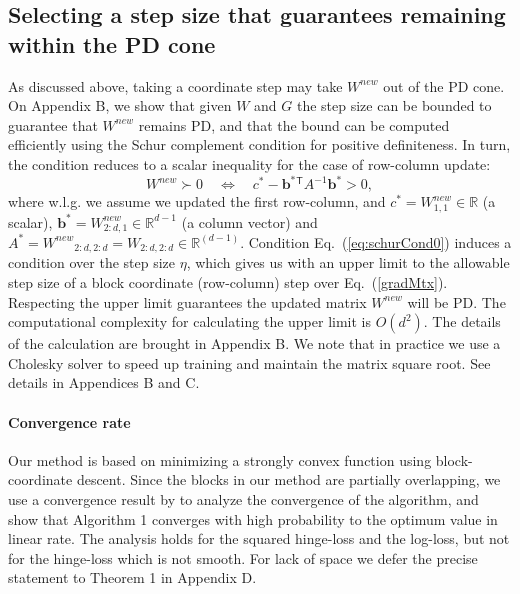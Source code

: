 \documentclass[twoside,11pt]{article}
\newcommand\mat[1]{{#1}}
\renewcommand\vec[1]{\mathbf{#1}}
\newcommand{\T}{{}^\mathsf{T}}
\newcommand{\W}{\mat{W}}
\newcommand{\newW}{{\mat{W^{new}}}}
\newcommand{\R}{\mathbb{R}}
\newcommand{\cholL}{\mat{L}}
\newcommand{\B}{\vec{b}}
\newcommand{\C}{c}
\newcommand{\invA}{A^{-1}}
\newcommand{\Wvec}{\W_{2:d,1}}
\newcommand{\Wscalar}{\W_{1,1}}
\renewcommand{\eqref}[1]{Eq.~(\ref{#1})}
\begin{document}
\subsection{Selecting a step size that guarantees remaining within the PD cone}\label{subsec:step} \vskip -4pt
As discussed above, taking a coordinate step may take $\newW$ out of the PD cone. On Appendix B, we show that given $\W$ and $\mat{G}$ the step size can be bounded to guarantee that $\newW$ remains PD, and that the bound can be computed efficiently using the Schur complement condition for positive definiteness. In turn, the condition reduces to a scalar inequality for the case of row-column update:
\begin{equation}\label{eq:schurCond0}
  \newW \succ  0 \quad \Leftrightarrow \quad  \C^* - \B^*\T \invA \B^* >  0,
\end{equation}
where w.l.g. we assume we updated the first row-column, and $\C^* = \Wscalar^{new} \in \R$ (a scalar), $\B^* = \Wvec^{new} \in \R^{d-1}$ (a column vector) and $A^* = \newW_{2:d,2:d} = \W_{2:d,2:d}\in \R^{(d-1)}$. Condition \eqref{eq:schurCond0} induces a condition over the step size $\eta$, which gives us with an upper limit to the allowable step size of a block coordinate (row-column) step over \eqref{gradMtx}. Respecting the upper limit guarantees the updated matrix $\W^{new}$ will be PD. The computational complexity for calculating the upper limit is $O(d^2)$. The details of the calculation are brought in Appendix B. We note that in practice we use a Cholesky solver \citep{CHOLMOD} to speed up training and maintain the matrix square root. See details in Appendices B and C.
\paragraph{Convergence rate}
Our method is based on minimizing a strongly convex function using block-coordinate descent. Since the blocks in our method are partially overlapping, we use a convergence result by \citet{richtarik2013optimal} to analyze the convergence of the algorithm, and show that Algorithm 1 converges with high probability to the optimum value in linear rate. The analysis holds for the squared hinge-loss and the log-loss, but not for the hinge-loss which is not smooth. For lack of space we defer the precise statement to Theorem 1 in Appendix D.
\end{document}
